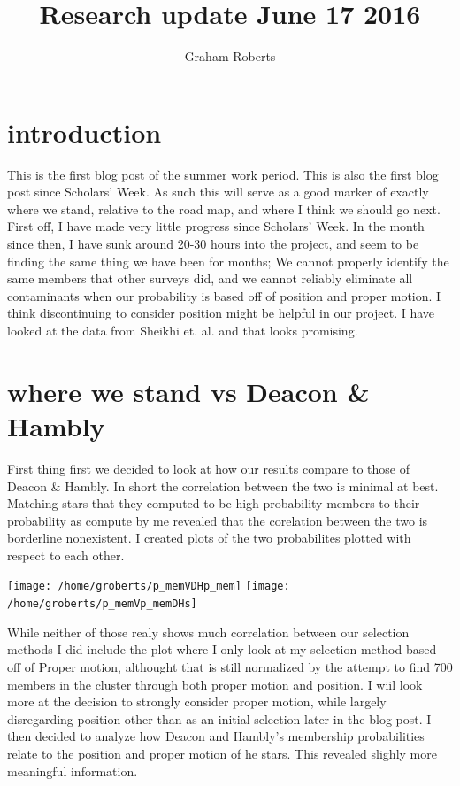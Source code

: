 \documentclass{article}
\author{Graham Roberts}
\title{Research update June 17 2016}
\begin{document}
\maketitle
\section{introduction}

This is the first blog post of the summer work period.  This is also the first blog post since Scholars' Week.  As such this will serve as a good marker of exactly where we stand, relative to the road map, and where I think we should go next.  First off, I have made very little progress since Scholars' Week.  In the month since then, I have sunk around 20-30 hours into the project, and seem to be finding the same thing we have been for months;  We cannot properly identify the same members that other surveys did, and we cannot reliably eliminate all contaminants when our probability is based off of position and proper motion.  I think discontinuing to consider position might be helpful in our project.  I have looked at the data from Sheikhi et. al. and that looks promising.

\section{where we stand vs Deacon \& Hambly}

First thing first we decided to look at how our results compare to those of Deacon \& Hambly.  In short the correlation between the two is minimal at best.  Matching stars that they computed to be high probability members to their probability as compute by me revealed that the corelation between the two is borderline nonexistent.  I created plots of the two probabilites plotted with respect to each other. 

\begin{center}
\texttt{[image: /home/groberts/p\_memVDHp\_mem]} 
\texttt{[image: /home/groberts/p\_memVp\_memDHs]}
\end{center}

While neither of those realy shows much correlation between our selection methods I did include the plot where I only look at my selection method based off of Proper motion, althought that is still normalized by the attempt to find 700 members in the cluster through both proper motion and position.  I wiil look more at the decision to strongly consider proper motion, while largely disregarding position other than as an initial selection later in the blog post.  I then decided to analyze how Deacon and Hambly's membership probabilities relate to the position and proper motion of he stars.  This revealed slighly more meaningful information.
\end{document}
